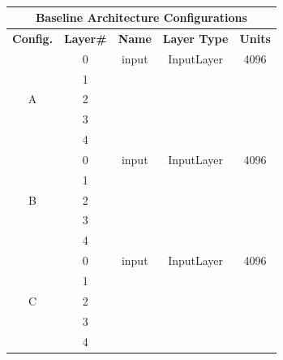 \begin{table}[!h]
\begin{center}
\begin{tabular}{|c|c|c|c|c|}
\hline
\multicolumn{5}{|c|}{Baseline Architecture Configurations} \\ \hline
\textbf{Config.} & \textbf{Layer#} & \textbf{Name} & \textbf{Layer Type} & \textbf{Units} \\ \hline
\multirow{5}{*}{A} & 0 & input & InputLayer & 4096 \\ \cline{2-5}
 & 1 & & & \\ \cline{2-5}
 & 2 & & & \\ \cline{2-5}
 & 3 & & & \\ \cline{2-5}
 & 4 & & & \\ \hline
\multirow{5}{*}{B} & 0 & input & InputLayer & 4096 \\ \cline{2-5}
 & 1 & & & \\ \cline{2-5}
 & 2 & & & \\ \cline{2-5}
 & 3 & & & \\ \cline{2-5}
 & 4 & & & \\ \hline
\multirow{5}{*}{C} & 0 & input & InputLayer & 4096 \\ \cline{2-5}
 & 1 & & & \\ \cline{2-5}
 & 2 & & & \\ \cline{2-5}
 & 3 & & & \\ \cline{2-5}
 & 4 & & & \\ \hline
\end{tabular}
\end{center}
\caption[Network architectures]{}
\label{tab:base-arch}
\end{table}



\cleardoublepage